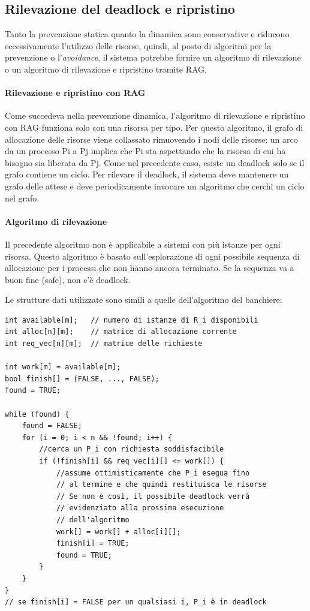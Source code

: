 \documentclass[a4paper]{article}
\begin{document}
\subsection{Rilevazione del deadlock e ripristino}
Tanto la prevenzione statica quanto la dinamica sono conservative e riducono eccessivamente l'utilizzo delle risorse, quindi, al posto di algoritmi per la prevenzione o l'\textit{avoidance}, il sistema potrebbe fornire un algoritmo di rilevazione o un algoritmo di rilevazione e ripristino tramite RAG.

\paragraph{Rilevazione e ripristino con RAG}
Come succedeva nella prevenzione dinamica, l'algoritmo di rilevazione e ripristino con RAG funziona solo con una risorsa per tipo. Per questo algoritmo, il grafo di allocazione delle risorse viene collassato rimuovendo i nodi delle risorse: un arco da un processo Pi a Pj implica che Pi sta aspettando che la risorsa di cui ha bisogno sia liberata da Pj. Come nel precedente caso, esiste un deadlock solo se il grafo contiene un ciclo. Per rilevare il deadlock, il sistema deve mantenere un grafo delle attese e deve periodicamente invocare un algoritmo che cerchi un ciclo nel grafo.

\paragraph{Algoritmo di rilevazione} Il precedente algoritmo non è applicabile a sistemi con più istanze per ogni risorsa. Questo algoritmo è basato sull'esplorazione di ogni possibile sequenza di allocazione per i processi che non hanno ancora terminato. Se la sequenza va a buon fine (safe), non c'è deadlock.

Le strutture dati utilizzate sono simili a quelle dell'algoritmo del banchiere:
\begin{Verbatim}[tabsize=3]
int available[m];   // numero di istanze di R_i disponibili
int alloc[n][m];    // matrice di allocazione corrente
int req_vec[n][m];  // matrice delle richieste

int work[m] = available[m];
bool finish[] = (FALSE, ..., FALSE);
found = TRUE;

while (found) {
    found = FALSE;
    for (i = 0; i < n && !found; i++) {
        //cerca un P_i con richiesta soddisfacibile
        if (!finish[i] && req_vec[i][] <= work[]) {
            //assume ottimisticamente che P_i esegua fino
            // al termine e che quindi restituisca le risorse
            // Se non è così, il possibile deadlock verrà
            // evidenziato alla prossima esecuzione
            // dell'algoritmo
            work[] = work[] + alloc[i][];
            finish[i] = TRUE;
            found = TRUE;
        }
    }
} 
// se finish[i] = FALSE per un qualsiasi i, P_i è in deadlock
\end{Verbatim}
\end{document}
